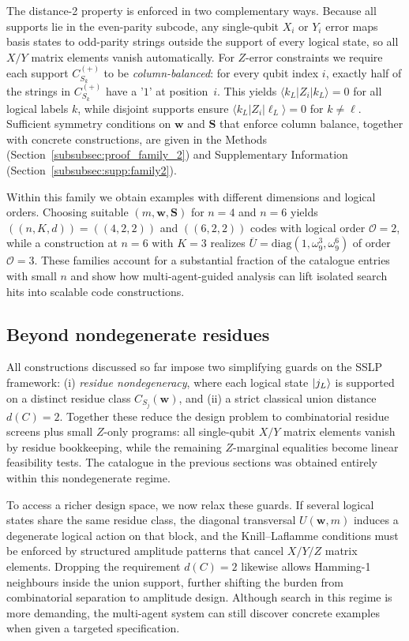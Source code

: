 \documentclass[pdflatex,sn-nature]{sn-jnl}%
\theoremstyle{thmstyleone}%
\theoremstyle{thmstyletwo}%
\theoremstyle{thmstylethree}%
\begin{document}
The distance-2 property is enforced in two complementary ways. Because all supports lie in the even-parity subcode, any single-qubit $X_i$ or $Y_i$ error maps basis states to odd-parity strings outside the support of every logical state, so all $X/Y$ matrix elements vanish automatically. For $Z$-error constraints we require each support $C^{(+)}_{S_k}$ to be \emph{column-balanced}: for every qubit index $i$, exactly half of the strings in $C^{(+)}_{S_k}$ have a '$1$' at position~$i$. This yields $\langle k_L|Z_i|k_L\rangle=0$ for all logical labels $k$, while disjoint supports ensure $\langle k_L|Z_i|\ell_L\rangle=0$ for $k\neq\ell$. Sufficient symmetry conditions on $\mathbf w$ and $\mathbf S$ that enforce column balance, together with concrete constructions, are given in the Methods (Section~\ref{subsubsec:proof_family_2}) and Supplementary Information (Section~\ref{subsubsec:supp:family2}).

Within this family we obtain examples with different dimensions and logical orders. Choosing suitable $(m,\mathbf w,\mathbf S)$ for $n=4$ and $n=6$ yields $((n,K,d))=((4,2,2))$ and $((6,2,2))$ codes with logical order $\mathcal O=2$, while a construction at $n=6$ with $K=3$ realizes
$\overline U=\mathrm{diag}(1,\omega_9^3,\omega_9^6)$ of order $\mathcal O=3$. These families account for a substantial fraction of the catalogue entries with small $n$ and show how multi-agent-guided analysis can lift isolated search hits into scalable code constructions.


\subsection{Beyond nondegenerate residues}
\label{subsec:extension}

All constructions discussed so far impose two simplifying guards on the SSLP framework: 
(i) \emph{residue nondegeneracy}, where each logical state $\ket{j_L}$ is supported on a distinct residue class $C_{S_j}(\mathbf w)$, and 
(ii) a strict classical union distance $d(C)=2$. 
Together these reduce the design problem to combinatorial residue screens plus small $Z$-only programs: all single-qubit $X/Y$ matrix elements vanish by residue bookkeeping, while the remaining $Z$-marginal equalities become linear feasibility tests. The catalogue in the previous sections was obtained entirely within this nondegenerate regime.

To access a richer design space, we now relax these guards. 
If several logical states share the same residue class, the diagonal transversal $U(\mathbf w,m)$ induces a degenerate logical action on that block, and the Knill--Laflamme conditions must be enforced by structured amplitude patterns that cancel $X/Y/Z$ matrix elements. 
Dropping the requirement $d(C)=2$ likewise allows Hamming-1 neighbours inside the union support, further shifting the burden from combinatorial separation to amplitude design. 
Although search in this regime is more demanding, the multi-agent system can still discover concrete examples when given a targeted specification.
\end{document}
